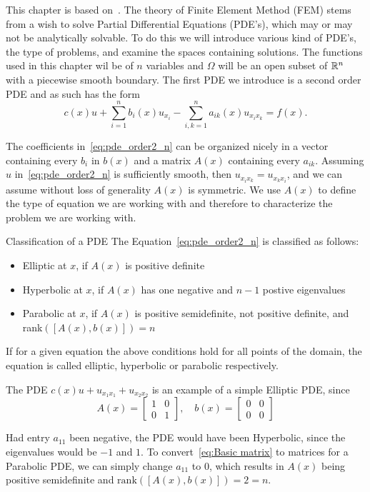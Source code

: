 This chapter is based on~\cite{Braess}.
The theory of Finite Element Method (FEM) stems from a 
wish to solve Partial Differential Equations (PDE's),
which may or may not be analytically solvable. 
To do this we will introduce various kind of PDE's, 
the type of
problems, and examine the spaces containing solutions. 
The functions used in this chapter wil be of $n$ 
variables and $\Omega$ will be 
an open subset of $\mathbb{R}^n$ with a piecewise smooth boundary.
The first PDE we introduce is a second order PDE and as 
such has the form
\begin{equation}
	 c(x) u + \sum_{i=1}^{n}b_i(x)u_{x_{i}}
	- \sum_{i,k=1}^{n}a_{ik}(x)u_{x_i x_k}\label{eq:pde_order2_n}
	= f(x).
\end{equation}

The coefficients in~\eqref{eq:pde_order2_n} can be 
organized nicely in a vector containing every $b_i$ 
in $b(x)$
and a matrix $A(x)$ containing every $a_{ik}$.
Assuming $u$ in~\eqref{eq:pde_order2_n} is sufficiently 
smooth, then $u_{x_i x_k} =u_{x_k x_i} $, and we can 
assume without loss of generality $A(x)$ is 
symmetric. %
We use $A(x)$ to define the type of equation we are working 
with and therefore to characterize the problem we are 
working with.
\begin{defn}{Classification of a PDE}
	The Equation~\eqref{eq:pde_order2_n} is classified as follows:
	\begin{itemize}
		\item Elliptic at $x$, if $A(x)$ is positive definite
		\item Hyperbolic at $x$, if $A(x)$ has one negative and $n-1$ postive eigenvalues
		\item Parabolic at $x$, if $A(x)$ is positive semidefinite, not positive definite, and rank$([A(x), b(x)])=n$
	\end{itemize}
	If for a given equation the above conditions hold for all points of the domain, the equation is called elliptic, hyperbolic or parabolic respectively.\label{def:pde_classification}
\end{defn}


\begin{exmp}{\quad}
The PDE $c(x)u + u_{x_1x_1} + u_{x_2x_2}$ is an example of a simple Elliptic PDE, since
\begin{equation}\label{eq:Basic matrix}
	A(x) = \begin{bmatrix}
		1 & 0\\
		0 & 1
	\end{bmatrix}, \quad
	b(x) = \begin{bmatrix}
		0 & 0\\
		0 & 0
	\end{bmatrix}
\end{equation}

Had entry $a_{11}$ been negative, the PDE would have been Hyperbolic, since the eigenvalues would be $-1$ and $1$. To convert~\eqref{eq:Basic matrix} to matrices for a Parabolic PDE, we can simply change $a_{11}$ to $0$, which results in $A(x)$ being positive semidefinite and $\text{rank}([A(x), b(x)]) = 2 = n$.
\end{exmp}
	

